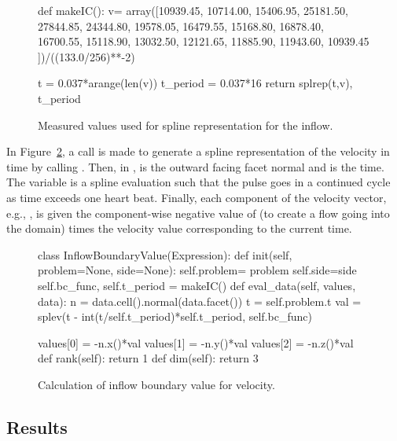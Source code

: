 \begin{figure}
  \begin{center}
    \begin{python}
def makeIC():
    v= array([10939.45, 10714.00, 15406.95, 25181.50, 27844.85,
	      24344.80, 19578.05, 16479.55, 15168.80, 16878.40,
	      16700.55, 15118.90, 13032.50, 12121.65, 11885.90,
	      11943.60, 10939.45 ])/((133.0/256)**-2)

    t = 0.037*arange(len(v))
    t_period = 0.037*16
    return splrep(t,v), t_period
    \end{python}
    \caption{Measured values used for spline representation for the inflow.}
    \label{fig:inflow_codeI}
  \end{center}
\end{figure}

In Figure~\ref{fig:inflow_codeII}, a call is made to generate a spline
representation of the velocity in time by calling .
Then, in ,  is the outward facing facet normal
and  is the time. The variable  is a spline evaluation
such that the pulse goes in a continued cycle as time exceeds one
heart beat. Finally, each component of the velocity vector, e.g.,
, is given the component-wise negative value of 
(to create a flow going into the domain) times the velocity value
corresponding to the current time.

\begin{figure}
  \begin{center}
    \begin{python}
class InflowBoundaryValue(Expression):
    def init(self, problem=None, side=None):
        self.problem= problem
        self.side=side
        self.bc_func, self.t_period = makeIC()
    def eval_data(self, values, data):
        n = data.cell().normal(data.facet())
        t = self.problem.t
        val =  splev(t - int(t/self.t_period)*self.t_period, self.bc_func)

        values[0] = -n.x()*val
        values[1] = -n.y()*val
        values[2] = -n.z()*val
    def rank(self):
        return 1
    def dim(self):
        return 3
    \end{python}
    \caption{Calculation of inflow boundary value for velocity.}
    \label{fig:inflow_codeII}
  \end{center}
\end{figure}

\subsection{Results}

